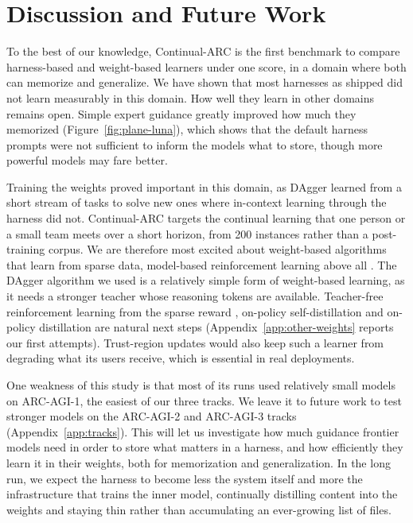 \section{Discussion and Future Work}
\label{sec:discussion}

To the best of our knowledge, Continual-ARC is the first benchmark to compare harness-based and weight-based learners under one score, in a domain where both can memorize and generalize. We have shown that most harnesses as shipped did not learn measurably in this domain. How well they learn in other domains remains open. Simple expert guidance greatly improved how much they memorized (Figure~\ref{fig:plane-luna}), which shows that the default harness prompts were not sufficient to inform the models what to store, though more powerful models may fare better.

Training the weights proved important in this domain, as DAgger learned from a short stream of tasks to solve new ones where in-context learning through the harness did not. Continual-ARC targets the continual learning that one person or a small team meets over a short horizon, from 200 instances rather than a post-training corpus. We are therefore most excited about weight-based algorithms that learn from sparse data, model-based reinforcement learning above all \citep{kaiser2020model}. The DAgger algorithm we used is a relatively simple form of weight-based learning, as it needs a stronger teacher whose reasoning tokens are available. Teacher-free reinforcement learning from the sparse reward \citep{shao2024deepseekmath}, on-policy self-distillation \citep{shenfeld2026sdft,hubotter2026sdpo} and on-policy distillation \citep{agarwal2024gkd} are natural next steps (Appendix~\ref{app:other-weights} reports our first attempts). Trust-region updates \citep{schulman2015trpo} would also keep such a learner from degrading what its users receive, which is essential in real deployments.

One weakness of this study is that most of its runs used relatively small models on ARC-AGI-1, the easiest of our three tracks. We leave it to future work to test stronger models on the ARC-AGI-2 and ARC-AGI-3 tracks (Appendix~\ref{app:tracks}). This will let us investigate how much guidance frontier models need in order to store what matters in a harness, and how efficiently they learn it in their weights, both for memorization and generalization. In the long run, we expect the harness to become less the system itself and more the infrastructure that trains the inner model, continually distilling content into the weights and staying thin rather than accumulating an ever-growing list of files.
